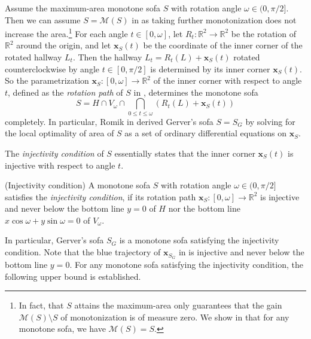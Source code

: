 Assume the maximum-area monotone sofa \(S\) with rotation angle \(\omega \in (0, \pi/2]\). Then we can assume \(S = \mathcal{M}(S)\) in  as taking further monotonization does not increase the area.\footnote{In fact, that \(S\) attains the maximum-area only guarantees that the gain \(\mathcal{M}(S) \setminus S\) of monotonization is of measure zero. We show in  that for any monotone sofa, we have \(\mathcal{M}(S) = S\).} For each angle \(t \in [0, \omega]\), let \(R_t : \mathbb{R}^2 \to \mathbb{R}^2\) be the rotation of \(\mathbb{R}^2\) around the origin, and let \(\mathbf{x}_S(t)\) be the coordinate of the inner corner of the rotated hallway \(L_t\). Then the hallway \(L_t = R_t(L) + \mathbf{x}_S(t)\) rotated counterclockwise by angle \(t \in [0, \pi/2]\) is determined by its inner corner \(\mathbf{x}_S(t)\). So the parametrization \(\mathbf{x}_S : [0, \omega] \to \mathbb{R}^2\) of the inner corner with respect to angle \(t\), defined as the \emph{rotation path} of \(S\) in \autocite{romikDifferentialEquationsExact2018}, determines the monotone sofa
\[
S = H \cap V_\omega \cap \bigcap_{0 \leq t \leq \omega} \left( R_t(L) + \mathbf{x}_S(t) \right) 
\]
completely. In particular, Romik in \autocite{romikDifferentialEquationsExact2018} derived Gerver’s sofa \(S = S_G\) by solving for the local optimality of area of \(S\) as a set of ordinary differential equations on \(\mathbf{x}_S\).

The \emph{injectivity condition} of \(S\) essentially states that the inner corner \(\mathbf{x}_S(t)\) is injective with respect to angle \(t\).

\begin{definition}

(Injectivity condition) A monotone sofa \(S\) with rotation angle \(\omega \in (0, \pi/2]\) satisfies the \emph{injectivity condition}, if its rotation path \(\mathbf{x}_S : [0, \omega] \to \mathbb{R}^2\) is injective and never below the bottom line \(y = 0\) of \(H\) nor the bottom line \(x \cos \omega + y \sin \omega = 0\) of \(V_\omega\).

\label{def:injectivity}
\end{definition}

In particular, Gerver’s sofa \(S_G\) is a monotone sofa satisfying the injectivity condition. Note that the blue trajectory of \(\mathbf{x}_{S_G}\) in  is injective and never below the bottom line \(y=0\). For any monotone sofa satisfying the injectivity condition, the following upper bound is established.

